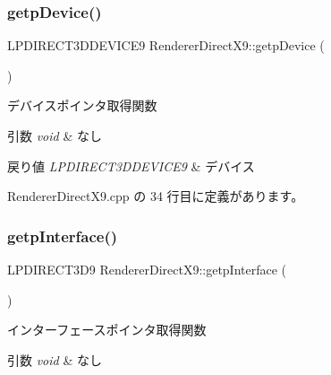 \mbox{\label{class_renderer_direct_x9_afabcea127b5af61e4d80564369e72baa}} 
\subsubsection{\texorpdfstring{getp\+Device()}{getpDevice()}}
{\footnotesize\ttfamily L\+P\+D\+I\+R\+E\+C\+T3\+D\+D\+E\+V\+I\+C\+E9 Renderer\+Direct\+X9\+::getp\+Device (\begin{DoxyParamCaption}{ }\end{DoxyParamCaption})}



デバイスポインタ取得関数 


\begin{DoxyParams}{引数}
{\em void} & なし \\
\hline
\end{DoxyParams}

\begin{DoxyRetVals}{戻り値}
{\em L\+P\+D\+I\+R\+E\+C\+T3\+D\+D\+E\+V\+I\+C\+E9} & デバイス \\
\hline
\end{DoxyRetVals}


 Renderer\+Direct\+X9.\+cpp の 34 行目に定義があります。

\mbox{\label{class_renderer_direct_x9_aad68389e45dd757dcde19d636f082a21}} 
\subsubsection{\texorpdfstring{getp\+Interface()}{getpInterface()}}
{\footnotesize\ttfamily L\+P\+D\+I\+R\+E\+C\+T3\+D9 Renderer\+Direct\+X9\+::getp\+Interface (\begin{DoxyParamCaption}{ }\end{DoxyParamCaption})}



インターフェースポインタ取得関数 


\begin{DoxyParams}{引数}
{\em void} & なし \\
\hline
\end{DoxyParams}

